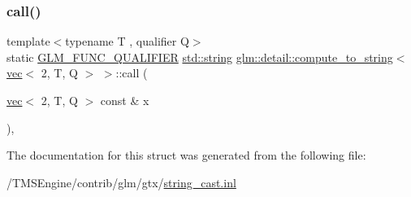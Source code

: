 \subsubsection{\texorpdfstring{call()}{call()}}
{\footnotesize\ttfamily template$<$typename T , qualifier Q$>$ \\
static \hyperlink{setup_8hpp_a33fdea6f91c5f834105f7415e2a64407}{G\+L\+M\+\_\+\+F\+U\+N\+C\+\_\+\+Q\+U\+A\+L\+I\+F\+I\+ER} \hyperlink{_s_d_l__opengl__glext_8h_ae84541b4f3d8e1ea24ec0f466a8c568b}{std\+::string} \hyperlink{structglm_1_1detail_1_1compute__to__string}{glm\+::detail\+::compute\+\_\+to\+\_\+string}$<$ \hyperlink{structglm_1_1vec}{vec}$<$ 2, T, Q $>$ $>$\+::call (\begin{DoxyParamCaption}\item[{\hyperlink{structglm_1_1vec}{vec}$<$ 2, T, Q $>$ const \&}]{x }\end{DoxyParamCaption})\hspace{0.3cm}{\ttfamily [inline]}, {\ttfamily [static]}}



The documentation for this struct was generated from the following file\+:\begin{DoxyCompactItemize}
\item 
/\+T\+M\+S\+Engine/contrib/glm/gtx/\hyperlink{string__cast_8inl}{string\+\_\+cast.\+inl}\end{DoxyCompactItemize}
